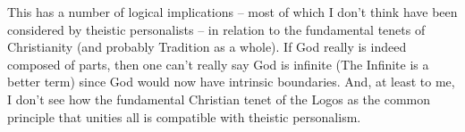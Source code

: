 \begin{footnotesize}
\begin{sffamily}
This has a number of logical implications – most of which I don't think have been considered by theistic personalists – in relation to the fundamental tenets of Christianity (and probably Tradition as a whole). If God really is indeed composed of parts, then one can't really say God is infinite (The Infinite is a better term) since God would now have intrinsic boundaries. And, at least to me, I don't see how the fundamental Christian tenet of the Logos as the common principle that unities all is compatible with theistic personalism.


\end{sffamily}\end{footnotesize}
